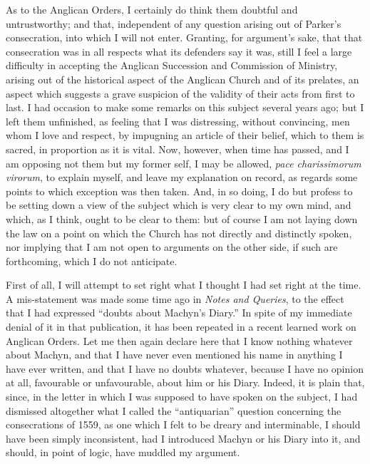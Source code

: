 As to the Anglican Orders, I certainly do think them doubtful and
untrustworthy; and that, independent of any question arising out of
Parker's consecration, into which I will not enter. Granting, for
argument's sake, that that consecration was in all respects what its
defenders say it was, still I feel a large difficulty in accepting the
Anglican Succession and Commission of Ministry, arising out of the
historical aspect of the Anglican Church and of its prelates, an
aspect which suggests a grave suspicion of the validity of their acts
from first to last. I had occasion to make some remarks on this
subject several years ago; but I left them unfinished, as feeling that
I was distressing, without convincing, men whom I love and respect, by
impugning an article of their belief, which to them is sacred, in
proportion as it is vital. Now, however, when time has passed, and I
am opposing not them but my former self, I may be allowed, \emph{pace
charissimorum virorum}, to explain myself, and leave my explanation
on record, as regards some points to which exception was then taken.
And, in so doing, I do but profess to be setting down a view of the
subject which is very clear to my own mind, and which, as I think,
ought to be clear to them: but of course I am not laying down the law
on a point on which the Church has not directly and distinctly spoken,
nor implying that I am not open to arguments on the other side, if
such are forthcoming, which I do not anticipate.

First of all, I will attempt to set right what I thought I had set
right at the time. A mis-statement was made some time ago in \emph{Notes
and Queries}, to the effect that I had expressed ``doubts about
Machyn's Diary.'' In spite of my immediate denial of it in that
publication, it has been repeated in a recent learned work on Anglican
Orders. Let me then again declare here that I know nothing whatever
about Machyn, and that I have never even mentioned his name in
anything I have ever written, and that I have no doubts whatever,
because I have no opinion at all, favourable or unfavourable, about
him or his Diary. Indeed, it is plain that, since, in the letter in
which I was supposed to have spoken on the subject, I had dismissed
altogether what I called the ``antiquarian'' question
concerning the consecrations of 1559, as one which I felt to be dreary
and interminable, I should have been simply inconsistent, had I
introduced Machyn or his Diary into it, and should, in point of logic,
have muddled my argument.

